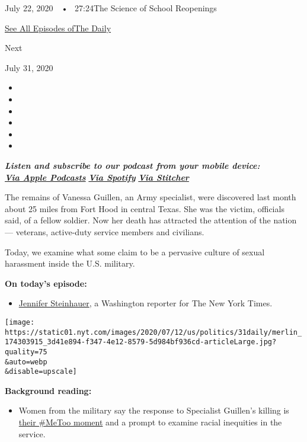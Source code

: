 July 22, 2020~~•~ 27:24The Science of School Reopenings

\href{https://www.nytimes.com/column/the-daily}{See All Episodes ofThe
Daily}

Next

July 31, 2020

\begin{itemize}
\item
\item
\item
\item
\item
\item
\end{itemize}

\emph{\textbf{Listen and subscribe to our podcast from your mobile
device:}}\\
\textbf{\href{https://itunes.apple.com/us/podcast/the-daily/id1200361736?mt=2}{\emph{Via
Apple Podcasts}}} \emph{\textbf{\textbar{}}}
\textbf{\href{https://open.spotify.com/show/3IM0lmZxpFAY7CwMuv9H4g?si=SfuMSC55R1qprFsRZU3_zw}{\emph{Via
Spotify}}} \emph{\textbf{\textbar{}}}
\textbf{\href{http://www.stitcher.com/podcast/the-new-york-times/the-daily-10}{\emph{Via
Stitcher}}}

The remains of Vanessa Guillen, an Army specialist, were discovered last
month about 25 miles from Fort Hood in central Texas. She was the
victim, officials said, of a fellow soldier. Now her death has attracted
the attention of the nation --- veterans, active-duty service members
and civilians.

Today, we examine what some claim to be a pervasive culture of sexual
harassment inside the U.S. military.

\textbf{On today's episode:}

\begin{itemize}
\tightlist
\item
  \href{https://www.nytimes.com/by/jennifer-steinhauer}{Jennifer
  Steinhauer}, a Washington reporter for The New York Times.
\end{itemize}

\texttt{[image: https://static01.nyt.com/images/2020/07/12/us/politics/31daily/merlin\_174303915\_3d41e894-f347-4e12-8579-5d984bf936cd-articleLarge.jpg?quality=75\\\&auto=webp\\\&disable=upscale]}

\textbf{Background reading:}

\begin{itemize}
\tightlist
\item
  Women from the military say the response to Specialist Guillen's
  killing is
  \href{https://www.nytimes.com/2020/07/11/us/politics/military-women-metoo-fort-hood.html}{their
  \#MeToo moment} and a prompt to examine racial inequities in the
  service.
\end{itemize}

